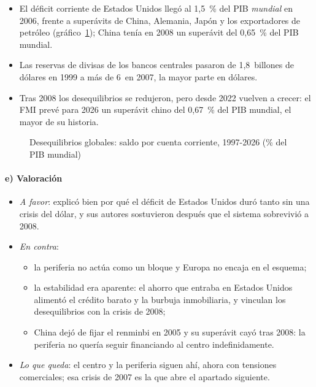 \documentclass[11pt]{article}
\begin{document}
\begin{itemize}
\item El déficit corriente de Estados Unidos llegó al 1,5~\% del PIB \emph{mundial} en 2006, frente a superávits de China, Alemania, Japón y los exportadores de petróleo (gráfico~\ref{fig:desequilibrios}); China tenía en 2008 un superávit del 0,65~\% del PIB mundial\nocite{FMI2026DataMapperBCA}.
\item Las reservas de divisas de los bancos centrales pasaron de 1,8~billones de dólares en 1999 a más de 6~en 2007, la mayor parte en dólares\nocite{FMI2026COFER}.
\item Tras 2008 los desequilibrios se redujeron, pero desde 2022 vuelven a crecer: el FMI prevé para 2026 un superávit chino del 0,67~\% del PIB mundial, el mayor de su historia\nocite{FMI2026DataMapperBCA,FMI2026ESR}.
\end{itemize}

\begin{figure}[H]
\centering
\caption{Desequilibrios globales: saldo por cuenta corriente, 1997-2026 (\% del PIB mundial)}\label{fig:desequilibrios}
\end{figure}

\paragraph{e) Valoración}

\begin{itemize}
\item \emph{A favor}: explicó bien por qué el déficit de Estados Unidos duró tanto sin una crisis del dólar, y sus autores sostuvieron después que el sistema sobrevivió a 2008\nocite{DooleyFolkertsLandauGarber2009}.
\item \emph{En contra}:
  \begin{itemize}
  \item la periferia no actúa como un bloque y Europa no encaja en el esquema;
  \item la estabilidad era aparente: el ahorro que entraba en Estados Unidos alimentó el crédito barato y la burbuja inmobiliaria, y \textcite{ObstfeldRogoff2009Imbalances} vinculan los desequilibrios con la crisis de 2008;
  \item China dejó de fijar el renminbi en 2005 y su superávit cayó tras 2008: la periferia no quería seguir financiando al centro indefinidamente.
  \end{itemize}
\item \emph{Lo que queda}: el centro y la periferia siguen ahí, ahora con tensiones comerciales; esa crisis de 2007 es la que abre el apartado siguiente.
\end{itemize}
\end{document}
